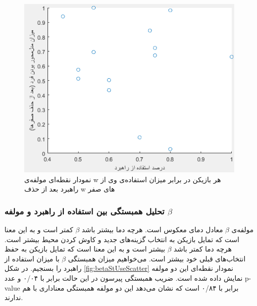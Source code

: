 \documentclass[twoside, a4paper,11pt]{book}
\numberwithin{equation}{chapter}
\numberwithin{table}{chapter}
\numberwithin{figure}{chapter}
\numberwithin{equation}{chapter}
\begin{document}
\begin{figure}
\centering
\includegraphics[scale=0.8]{Figures/stUsewScatterNoZero.png}
\caption{\label{fig:stUsewScatterNoZero}
نمودار نقطه‌ای مولفه‌ی w هر بازیکن در برابر میزان استفاده‌ی وی از راهبرد بعد از حذف w های صفر
}
\end{figure}

\subsubsection{تحلیل همبستگی بین استفاده از راهبرد و مولفه $\beta$}

مولفه‌ی $\beta$ معادل دمای معکوس است. هرچه دما بیشتر باشد $\beta$ کمتر است و به این معنا است که تمایل بازیکن به انتخاب گزینه‌های جدید و کاوش کردن محیط بیشتر است. هرچه دما کمتر باشد $\beta$ بیشتر است و به این معنا است که تمایل بازیکن به حفظ انتخاب‌های قبلی خود بیشتر است. می‌خواهیم میزان همبستگی $\beta$ با میزان استفاده از راهبرد را بسنجیم. در شکل \ref{fig:betaStUseScatter} نمودار نقطه‌ای این دو مولفه نمایش داده شده است. ضریب همبستگی پیرسون در این حالت برابر با ۰/۰۴ و عدد p-value برابر با ۰/۸۴ است که نشان می‌دهد این دو مولفه همبستگی معناداری با هم ندارند.
\end{document}
